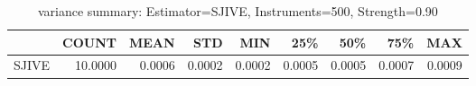 \begin{table}[ht]
\centering
\caption{variance summary: Estimator=SJIVE, Instruments=500, Strength=0.90}
\begin{tabular}{lrrrrrrrr}
\toprule
 & COUNT & MEAN & STD & MIN & 25\% & 50\% & 75\% & MAX \\
\midrule
SJIVE & 10.0000 & 0.0006 & 0.0002 & 0.0002 & 0.0005 & 0.0005 & 0.0007 & 0.0009 \\
\bottomrule
\end{tabular}
\end{table}

